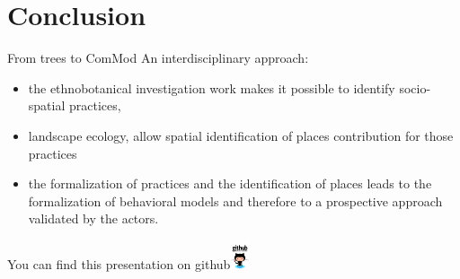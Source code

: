 \documentclass[newPxFont]{beamer}
\begin{document}
\section{Conclusion}
\begin{frame}[c]{From trees to ComMod}
\vspace{-1cm}
An interdisciplinary approach:
\begin{itemize}
  \item the ethnobotanical  investigation work makes it possible to identify socio-spatial practices,
  \item landscape ecology, allow spatial identification of places contribution for those practices
  \item the formalization of practices and the identification of places leads to the formalization of behavioral models and therefore to a prospective approach validated by the actors.
\end{itemize}
\end{frame}


{
%
\begin{frame}
  \vspace{-1em}
  \begin{minipage}[t][.8\textheight]{\textwidth}

    \vfill

  \end{minipage}
  \vspace{-3.5em}
  \centering
	You can find this presentation on github\includegraphics[height=0.85cm]{img/github}

\end{frame}
}
\end{document}
